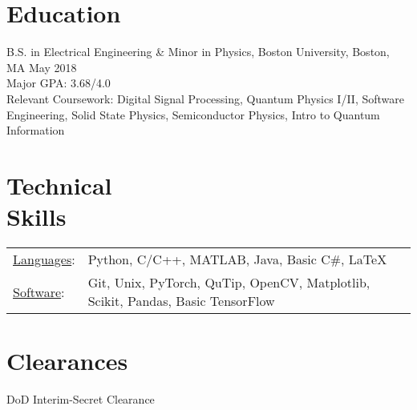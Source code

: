\documentclass[margin]{res}
\begin{document}
\begin{resume} 
 

\section{Education} 
B.S. in Electrical Engineering \& Minor in Physics, Boston University, Boston, MA \hfill May 2018 \\
Major GPA: 3.68/4.0 \\
Relevant Coursework: Digital Signal Processing, Quantum Physics I/II, Software Engineering, Solid State Physics, Semiconductor Physics, Intro to Quantum Information 



\section{Technical \\ Skills}
   \begin{tabular}{l p{5.0in}}
     \underline{Languages}: & Python, C/C++, MATLAB, Java, Basic C\#, LaTeX \\ 
     \underline{Software}: & Git, Unix, PyTorch, QuTip, OpenCV, Matplotlib, Scikit, Pandas, Basic TensorFlow
 \end{tabular}





 
\section{Clearances}
DoD Interim-Secret Clearance 


\end{resume}
\end{document}
